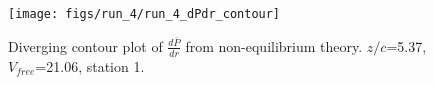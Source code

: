 \begin{figure}[H]
\centering
\texttt{[image: figs/run\_4/run\_4\_dPdr\_contour]}
\caption{Diverging contour plot of $\frac{d\bar{P}}{dr}$ from non-equilibrium theory. $z/c$=5.37, $V_{free}$=21.06, station 1.}
\label{fig:run_4_dPdr_contour}
\end{figure}


